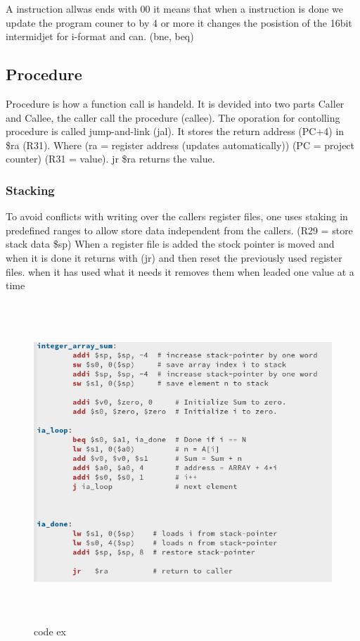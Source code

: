 A instruction allwas ends with 00 it means that when a instruction is done we update the program couner
to by 4 or more it changes the posistion of the 16bit intermidjet for i-format and can. (bne, beq)

\subsection{Procedure}
Procedure is how a function call is handeld. It is devided into two parts Caller and Callee,
the caller call the procedure (callee).
The oporation for contolling procedure is called jump-and-link (jal).
It stores the return address (PC+4) in \$ra (R31).
Where (ra = register address (updates automatically))
(PC = project counter)
(R31 = value).
jr \$ra returns the value.

\newpage
\subsubsection{Stacking}
To avoid conflicts with writing over the callers register files, one uses staking in predefined
ranges to allow store data independent from the callers. 
(R29 =  store stack data \$sp)
When a register file is added the stock pointer is moved and when it is done it returns with (jr) and then
reset the previously used register files.
when it has used what it needs it removes them when leaded one value at a time


\begin{figure}[h]
    \vspace{10mm}
    \centering
    \includegraphics[width=16cm, height=12cm]{image/code-ex.png} 
    \caption{code ex}
\end{figure}

